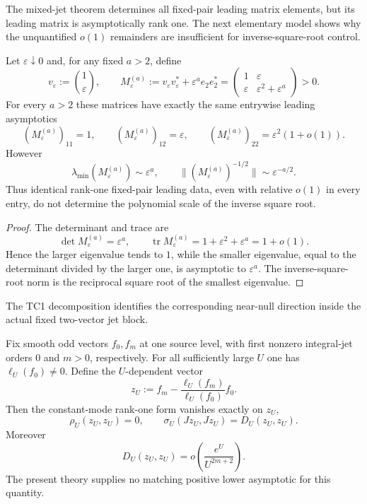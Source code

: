 The mixed-jet theorem determines all fixed-pair leading matrix elements, but its
leading matrix is asymptotically rank one.  The next elementary model shows why the
unquantified $o(1)$ remainders are insufficient for inverse-square-root control.

\begin{proposition}
\label{prop:o3n-rankone-insufficiency}
Let $\varepsilon\downarrow0$ and, for any fixed $a>2$, define
\[
 v_\varepsilon:=\binom{1}{\varepsilon},
 \qquad
 M_\varepsilon^{(a)}
 :=v_\varepsilon v_\varepsilon^*
   +\varepsilon^a e_2e_2^*
 =\begin{pmatrix}
 1&\varepsilon\\
 \varepsilon&\varepsilon^2+\varepsilon^a
 \end{pmatrix}>0.
\]
For every $a>2$ these matrices have exactly the same entrywise leading asymptotics
\[
 (M_\varepsilon^{(a)})_{11}=1,
 \qquad
 (M_\varepsilon^{(a)})_{12}=\varepsilon,
 \qquad
 (M_\varepsilon^{(a)})_{22}=\varepsilon^2(1+o(1)).
\tag{O3N.9}\label{eq:o3n-same-leading}
\]
However
\[
 \boxed{
 \lambda_{\min}(M_\varepsilon^{(a)})\sim\varepsilon^a,
 \qquad
 \|(M_\varepsilon^{(a)})^{-1/2}\|
 \sim\varepsilon^{-a/2}.
 }
\tag{O3N.10}\label{eq:o3n-inverse-root-scale}
\]
Thus identical rank-one fixed-pair leading data, even with relative $o(1)$ in every
entry, do not determine the polynomial scale of the inverse square root.
\end{proposition}

\begin{proof}
The determinant and trace are
\[
 \det M_\varepsilon^{(a)}=\varepsilon^a,
 \qquad
 \operatorname{tr}M_\varepsilon^{(a)}
 =1+\varepsilon^2+\varepsilon^a=1+o(1).
\]
Hence the larger eigenvalue tends to $1$, while the smaller eigenvalue, equal to the
determinant divided by the larger one, is asymptotic to $\varepsilon^a$.  The
inverse-square-root norm is the reciprocal square root of the smallest eigenvalue.
\end{proof}

The TC1 decomposition identifies the corresponding near-null direction inside the
actual fixed two-vector jet block.

\begin{proposition}\label{prop:o3n-nearnull}
Fix smooth odd vectors $f_0,f_m$ at one source level, with first nonzero integral-jet
orders $0$ and $m>0$, respectively.  For all sufficiently large $U$ one has
$\ell_U(f_0)\ne0$.  Define the $U$-dependent vector
\[
 \boxed{
 z_U:=f_m-\frac{\ell_U(f_m)}{\ell_U(f_0)}f_0.
 }
\tag{O3N.11}\label{eq:o3n-zU}
\]
Then the constant-mode rank-one form vanishes exactly on $z_U$,
\[
 \boxed{
 \rho_U(z_U,z_U)=0,
 \qquad
 \sigma_U(Jz_U,Jz_U)=D_U(z_U,z_U).
 }
\tag{O3N.12}\label{eq:o3n-nearnull-exact}
\]
Moreover
\[
 \boxed{
 D_U(z_U,z_U)
 =o\!\left(\frac{e^U}{U^{2m+2}}\right).
 }
\tag{O3N.13}\label{eq:o3n-nearnull-littleo}
\]
The present theory supplies no matching positive lower asymptotic for this quantity.
\end{proposition}

